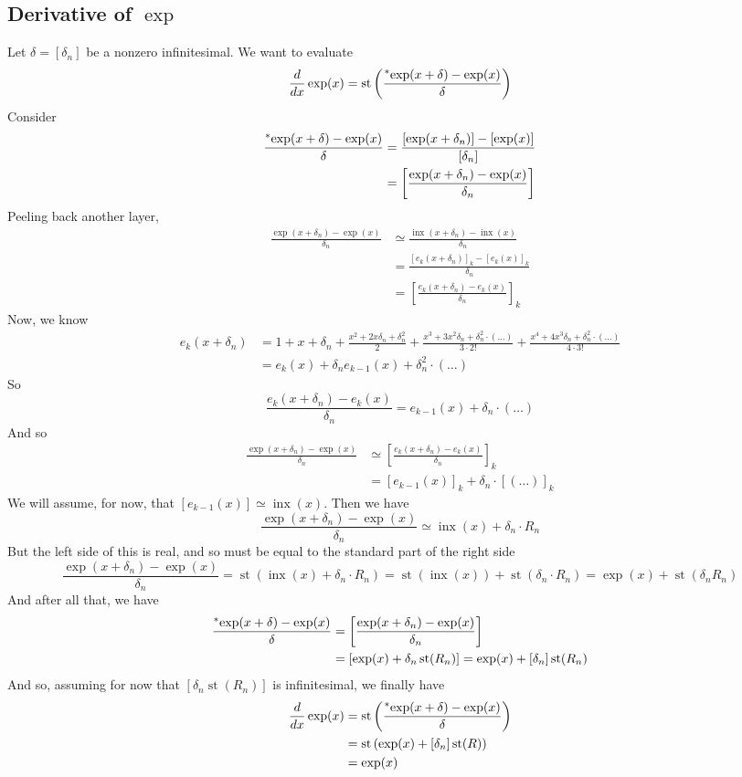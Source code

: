 \documentclass{article}
\newcommand{\stp}[1]{\st\left(#1\right)}
\newcommand{\hr}[1]{\prescript{*}{}{#1}}
\DeclareMathOperator{\st}{st}
\DeclareMathOperator{\inx}{inx}
\theoremstyle{definition}
\begin{document}
\subsection{Derivative of $\exp$}

Let $\delta = [\delta_n]$ be a nonzero infinitesimal. We want to evaluate
\[\frac{d}{dx}\exp(x) = \stp{\frac{\hr{\exp}(x + \delta) - \exp(x)}{\delta}}\]
Consider
\begin{align*}
    \frac{\hr{\exp}(x + \delta) - \exp(x)}{\delta} &= \frac{[\exp(x + \delta_n)] - [\exp(x)]}{[\delta_n]} \\
    &= \left[\frac{\exp(x + \delta_n) - \exp(x)}{\delta_n}\right]
\end{align*}
Peeling back another layer,
\begin{align*}
    \frac{\exp(x + \delta_n) - \exp(x)}{\delta_n} &\simeq \frac{\inx(x+\delta_n)-\inx(x)}{\delta_n} \\
    &= \frac{[e_k(x+\delta_n)]_k - [e_k(x)]_k}{\delta_n} \\
    &= \left[\frac{e_k(x+\delta_n) - e_k(x)}{\delta_n}\right]_k
\end{align*}
Now, we know
\begin{align*}
    e_k(x + \delta_n) &= 1 + x + \delta_n + \frac{x^2 + 2x\delta_n + \delta_n^2}{2} + \frac{x^3 + 3x^2\delta_n + \delta_n^2 \cdot (\ldots)}{3\cdot 2!} + \frac{x^4 + 4x^3\delta_n + \delta_n^2 \cdot (\ldots)}{4\cdot 3!}\\
    &= e_k(x) + \delta_n e_{k-1}(x) + \delta_n^2 \cdot (\ldots)
\end{align*}
So
\[ \frac{e_k(x+\delta_n) - e_k(x)}{\delta_n} = e_{k-1}(x) + \delta_n \cdot (\ldots) \]
And so
\begin{align*}
    \frac{\exp(x + \delta_n) - \exp(x)}{\delta_n} &\simeq \left[\frac{e_k(x+\delta_n) - e_k(x)}{\delta_n}\right]_k \\
    &= [e_{k-1}(x)]_k + \delta_n \cdot [(\ldots)]_k
\end{align*}
We will assume, for now, that $[e_{k-1}(x)] \simeq \inx(x)$. Then we have
\[ \frac{\exp(x + \delta_n) - \exp(x)}{\delta_n} \simeq \inx(x) + \delta_n \cdot R_n \]
But the left side of this is real, and so must be equal to the standard part of the right side
\[ \frac{\exp(x + \delta_n) - \exp(x)}{\delta_n} = \stp{\inx(x) + \delta_n \cdot R_n} = \st(\inx(x)) + \st(\delta_n \cdot R_n) = \exp(x) + \st(\delta_n R_n) \]
And after all that, we have
\begin{align*}
    \frac{\hr{\exp}(x + \delta) - \exp(x)}{\delta} &= \left[\frac{\exp(x + \delta_n) - \exp(x)}{\delta_n}\right] \\
    &= [\exp(x) + \delta_n \st(R_n)] = \exp(x) + [\delta_n] \st(R_n)
\end{align*}
And so, assuming for now that $[\delta_n \st(R_n)]$ is infinitesimal, we finally have
\begin{align*}
    \frac{d}{dx}\exp(x) &= \stp{\frac{\hr{\exp}(x + \delta) - \exp(x)}{\delta}} \\
    &= \stp{\exp(x) + [\delta_n] \st(R)} \\
    &= \exp(x)
\end{align*}
\pagebreak
\end{document}
